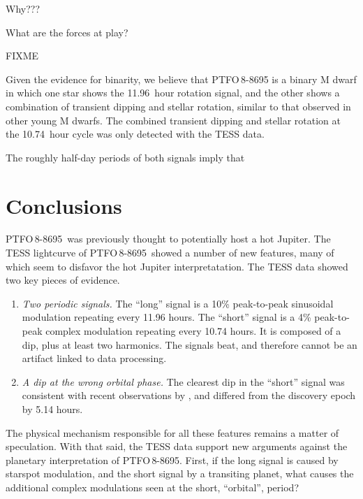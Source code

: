 \documentclass[12pt,twocolumn,tighten]{aastex62}
\newcommand{\ptfo}{PTFO$\,$8-8695}
\begin{document}
Why???

What are the forces at play?

FIXME


Given the evidence for binarity, we believe that PTFO$\,$8-8695 is a
binary M dwarf in which one star shows the 11.96~hour rotation signal,
and the other shows a combination of transient dipping and stellar
rotation, similar to that observed in other young M dwarfs.  The
combined transient dipping and stellar rotation at the 10.74~hour
cycle was only detected with the TESS data.








The roughly half-day periods of both signals imply that 






\section{Conclusions}
\label{sec:conclusions}

\ptfo\ was previously thought to potentially host a hot Jupiter.
The TESS lightcurve of \ptfo\ showed a number of new features,
many of which seem to disfavor the hot Jupiter interpretatation.
The TESS data showed two key pieces of evidence.
\begin{enumerate}
  \item {\it Two periodic signals.} The ``long'' signal is a 10\%
      peak-to-peak sinusoidal modulation repeating every 11.96 hours.
      The ``short'' signal is a 4\% peak-to-peak complex modulation
      repeating every 10.74 hours. It is composed of a dip, plus at
      least two harmonics. The signals beat, and therefore cannot be
      an artifact linked to data processing.
  \item {\it A dip at the wrong orbital phase.} The clearest dip in
    the ``short'' signal was consistent with recent observations by
    \citet{tanimoto_evidence_2020}, and differed from the discovery
    epoch by 5.14 hours.
\end{enumerate}

The physical mechanism responsible for all these features remains a
matter of speculation.
With that said, the TESS data support new arguments against the planetary
interpretation of \ptfo.
First, if the long signal is caused by starspot modulation, and the
short signal by a transiting planet, what causes the additional
complex modulations seen at the short, ``orbital'', period?
\end{document}
